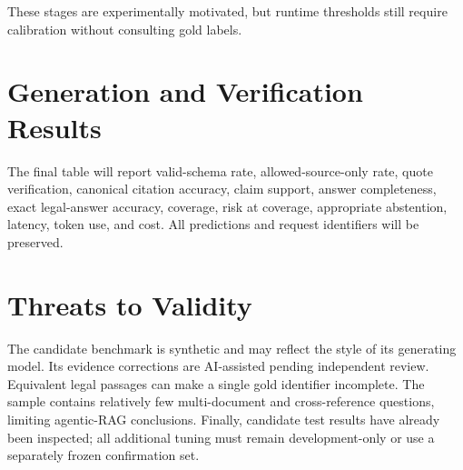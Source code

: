 These stages are experimentally motivated, but runtime thresholds still require calibration without consulting gold labels.

\section{Generation and Verification Results}


The final table will report valid-schema rate, allowed-source-only rate, quote verification, canonical citation accuracy, claim support, answer completeness, exact legal-answer accuracy, coverage, risk at coverage, appropriate abstention, latency, token use, and cost. All predictions and request identifiers will be preserved.

\section{Threats to Validity}

The candidate benchmark is synthetic and may reflect the style of its generating model. Its evidence corrections are AI-assisted pending independent review. Equivalent legal passages can make a single gold identifier incomplete. The sample contains relatively few multi-document and cross-reference questions, limiting agentic-RAG conclusions. Finally, candidate test results have already been inspected; all additional tuning must remain development-only or use a separately frozen confirmation set.

